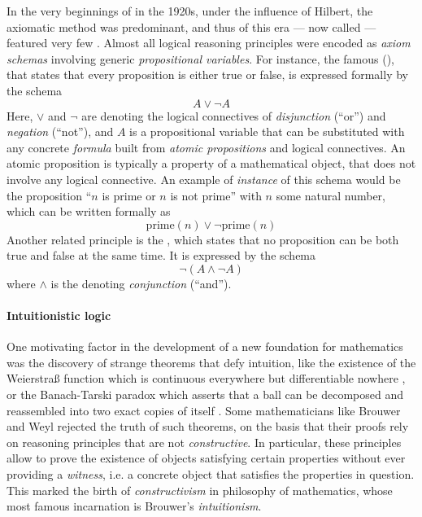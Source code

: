 \AP
In the very beginnings of  in the 1920s, under the influence of
Hilbert, the axiomatic method was predominant, and thus  of
this era --- now called  --- featured very few
. Almost all logical reasoning principles were encoded as
\emph{axiom schemas} involving generic \emph{propositional variables}. For
instance, the famous  (), that states
that every proposition is either true or false, is expressed formally by the
schema
$$A \lor \neg A$$
Here, $\lor$ and $\neg$ are  denoting the logical connectives of
\emph{disjunction} (``or'') and \emph{negation} (``not''), and $A$ is a
propositional variable that can be substituted with any concrete \emph{formula}
built from \emph{atomic propositions} and logical connectives. An atomic
proposition is typically a property of a mathematical object, that does not
involve any logical connective. An example of \emph{instance} of this schema
would be the proposition ``$n$ is prime or $n$ is not prime'' with $n$ some
natural number, which can be written formally as
$$\mathrm{prime}(n) \lor \neg\mathrm{prime}(n)$$
\AP Another related principle is the , which states
that no proposition can be both true and false at the same time. It is expressed
by the schema
$$\neg (A \land \neg A)$$
where $\land$ is the  denoting \emph{conjunction} (``and'').

\paragraph{Intuitionistic logic}

One motivating factor in the development of a new foundation for mathematics was
the discovery of strange theorems that defy intuition, like the existence of the
Weierstra{\ss} function which is continuous everywhere but differentiable
nowhere , or the Banach-Tarski paradox which
asserts that a ball can be decomposed and reassembled into two exact copies of
itself . Some mathematicians like Brouwer and Weyl
rejected the truth of such theorems, on the basis that their proofs rely on
reasoning principles that are not \emph{constructive}. In particular, these principles
allow to prove the existence of objects satisfying certain properties without
ever providing a \emph{witness}, i.e. a concrete object that satisfies the
properties in question. This marked the birth of \emph{constructivism} in
philosophy of mathematics, whose most famous incarnation is Brouwer's
\emph{intuitionism}.

